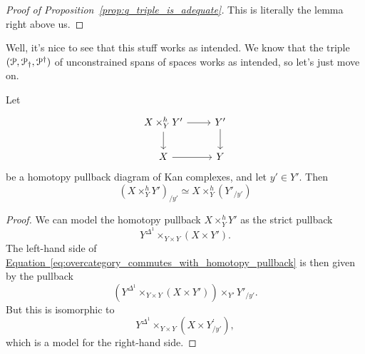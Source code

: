 \documentclass[main.tex]{subfiles}
\begin{document}
\begin{proof}[Proof of Proposition~\ref*{prop:q_triple_is_adequate}]
  This is literally the lemma right above us.
\end{proof}

Well, it's nice to see that this stuff works as intended. We know that the triple $(\mathcal{P}, \mathcal{P}_{\dagger}, \mathcal{P}^{\dagger})$ of unconstrained spans of spaces works as intended, so let's just move on.

\begin{lemma}
  \label{lemma:homotopy_pullbacks_and_overcategories}
  Let
  \begin{equation*}
    \begin{tikzcd}
      X \times_{Y}^{h} Y'
      \arrow[r]
      \arrow[d]
      & Y'
      \arrow[d]
      \\
      X
      \arrow[r]
      & Y
    \end{tikzcd}
  \end{equation*}
  be a homotopy pullback diagram of Kan complexes, and let $y' \in Y'$. Then
  \begin{equation}
    \label{eq:overcategory_commutes_with_homotopy_pullback}
    (X \times_{Y}^{h}Y')_{/y'} \simeq X \times_{Y}^{h} (Y'_{/y'})
  \end{equation}
\end{lemma}
\begin{proof}
  We can model the homotopy pullback $X \times^{h}_{Y}Y'$ as the strict pullback
  \begin{equation*}
    Y^{\Delta^{1}} \times_{Y \times Y} (X \times Y').
  \end{equation*}
  The left-hand side of \hyperref[eq:overcategory_commutes_with_homotopy_pullback]{Equation~\ref*{eq:overcategory_commutes_with_homotopy_pullback}} is then given by the pullback
  \begin{equation*}
    \left(Y^{\Delta^{1}} \times_{Y \times Y}(X \times Y')\right) \times_{Y'} Y'_{/y'}.
  \end{equation*}
  But this is isomorphic to
  \begin{equation*}
    Y^{\Delta^{1}} \times_{Y \times Y} (X \times Y^{'}_{/y'}),
  \end{equation*}
  which is a model for the right-hand side.
\end{proof}
\end{document}
